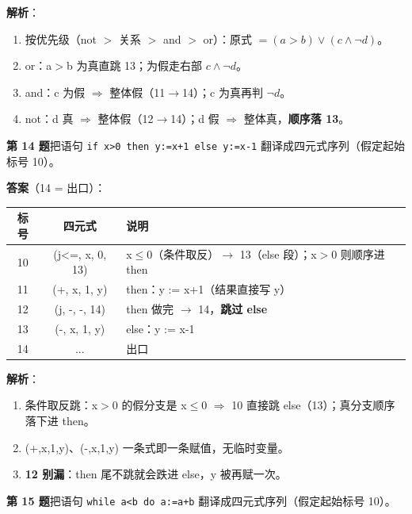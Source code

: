 \documentclass[12pt,a4paper,fontset=windows]{ctexart}
\begin{document}
\textbf{解析}：
\begin{enumerate}
\item 按优先级（not $>$ 关系 $>$ and $>$ or）：原式 $=(a>b) \vee (c \wedge \neg d)$。
\item or：a$>$b 为真直跳 13；为假走右部 $c \wedge \neg d$。
\item and：c 为假 $\Rightarrow$ 整体假（11$\to$14）；c 为真再判 $\neg d$。
\item not：d 真 $\Rightarrow$ 整体假（12$\to$14）；d 假 $\Rightarrow$ 整体真，\textbf{顺序落 13}。
\end{enumerate}

\begin{qbox}
{\large\bfseries 第 14 题}\quad 把语句 \texttt{if x>0 then y:=x+1 else y:=x-1} 翻译成四元式序列（假定起始标号 10）。
\end{qbox}

\textbf{答案}（14 = 出口）：

\begin{center}
\renewcommand{\arraystretch}{1.25}
\begin{tabular}{c c p{8.2cm}}
\toprule
\textbf{标号} & \textbf{四元式} & \textbf{说明} \\
\midrule
10 & (j<=, x, 0, 13) & x$\le$0（条件取反）$\to$ 13（else 段）；x$>$0 则顺序进 then \\
11 & (+, x, 1, y) & then：y := x+1（结果直接写 y） \\
12 & (j, -, -, 14) & then 做完 $\to$ 14，\textbf{跳过 else} \\
13 & (-, x, 1, y) & else：y := x-1 \\
14 & ... & 出口 \\
\bottomrule
\end{tabular}
\end{center}

\textbf{解析}：
\begin{enumerate}
\item 条件取反跳：x$>$0 的假分支是 x$\le$0 $\Rightarrow$ 10 直接跳 else（13）；真分支顺序落下进 then。
\item (+,x,1,y)、(-,x,1,y) 一条式即一条赋值，无临时变量。
\item \textbf{12 别漏}：then 尾不跳就会跌进 else，y 被再赋一次。
\end{enumerate}

\begin{qbox}
{\large\bfseries 第 15 题}\quad 把语句 \texttt{while a<b do a:=a+b} 翻译成四元式序列（假定起始标号 10）。
\end{qbox}
\end{document}
